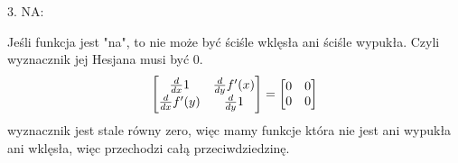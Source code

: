 \documentclass{article}[13pt]
\begin{document}
{\color{red}3. NA:}
\medskip

Jeśli funkcja jest "na", to nie może być ściśle wklęsła ani ściśle wypukła. Czyli wyznacznik jej Hesjana musi być 0.
\begin{align*}
    \begin{bmatrix}
        {d\over dx}1 & {d\over dy} f'(x)\\
        {d\over dx}f'(y) & {d\over dy}1
    \end{bmatrix}=
    \begin{bmatrix}
        0 & 0\\
        0 & 0
    \end{bmatrix}
\end{align*}
wyznacznik jest stale równy zero, więc mamy funkcje która nie jest ani wypukła ani wklęsła, więc przechodzi całą przeciwdziedzinę.
\end{document}
